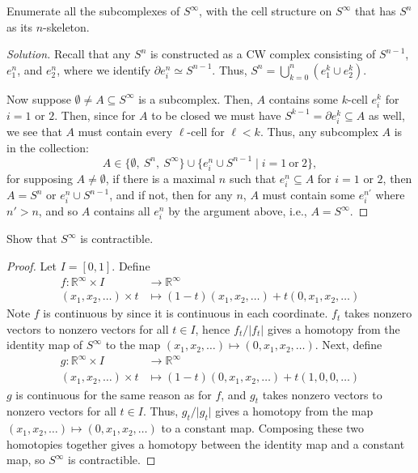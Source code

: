 \documentclass[12pt]{article}
\theoremstyle{remark}
\newcommand{\RR}{\mathbb{R}}
\begin{document}
\begin{problem}
  Enumerate all the subcomplexes of $S^\infty$, with the cell structure on $S^\infty$ that has $S^n$ as its $n$-skeleton.
\end{problem}
\begin{proof}[Solution]
  Recall that any $S^n$ is constructed as a CW complex consisting of $S^{n-1}$, $e_1^n$, and $e_2^n$, where we identify $\partial e_i^n \simeq S^{n-1}$. Thus, $S^n = \bigcup_{k=0}^n (e_1^k \cup e_2^k)$.
  \par Now suppose $\emptyset \ne A \subseteq S^\infty$ is a subcomplex. Then, $A$ contains some $k$-cell $e_i^k$ for $i=1$ or $2$. Then, since for $A$ to be closed we must have $S^{k-1} = \partial e_i^k \subseteq A$ as well, we see that $A$ must contain every $\ell$-cell for $\ell < k$. Thus, any subcomplex $A$ is in the collection:
  \begin{equation*}
    A \in \{\emptyset,~S^n,~S^\infty\} \cup \{ e_i^n \cup S^{n-1}\mid i=1~\text{or}~2 \},
  \end{equation*}
  for supposing $A \ne \emptyset$, if there is a maximal $n$ such that $e_i^n \subseteq A$ for $i=1$ or $2$, then $A = S^n$ or $e_i^n \cup S^{n-1}$, and if not, then for any $n$, $A$ must contain some $e_i^{n'}$ where $n' > n$, and so $A$ contains all $e_i^n$ by the argument above, i.e., $A = S^\infty$.
\end{proof}

\begin{problem}
  Show that $S^\infty$ is contractible.
\end{problem}
\begin{proof}
  Let $I = [0,1]$. Define
  \begin{align*}
    f \colon \RR^\infty \times I &\to \RR^\infty\\
    (x_1,x_2,\ldots) \times t &\mapsto (1-t)(x_1,x_2,\ldots) + t(0,x_1,x_2,\ldots)
  \end{align*}
  Note $f$ is continuous by \cite[Thm.~19.6]{Mun00} since it is continuous in
  each coordinate. $f_t$ takes nonzero vectors to nonzero vectors for all
  $t \in I$, hence $f_t/\lvert f_t \rvert$ gives a homotopy from the identity map
  of $S^\infty$ to the map $(x_1,x_2,\ldots) \mapsto (0,x_1,x_2,\ldots)$.
  Next, define
  \begin{align*}
    g \colon \RR^\infty \times I &\to \RR^\infty\\
    (x_1,x_2,\ldots) \times t &\mapsto (1-t)(0,x_1,x_2,\ldots) + t(1,0,0,\ldots)
  \end{align*}
  $g$ is continuous for the same reason as for $f$, and $g_t$ takes nonzero
  vectors to nonzero vectors for all $t\in I$. Thus, $g_t/\lvert g_t \rvert$
  gives a homotopy from the map $(x_1,x_2,\ldots) \mapsto (0,x_1,x_2,\ldots)$ to
  a constant map. Composing these two homotopies together gives a homotopy
  between the identity map and a constant map, so $S^\infty$ is contractible.
\end{proof}
\end{document}
